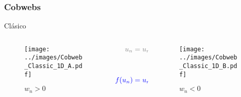 \documentclass{beamer}
\begin{document}
\begin{frame}
    \frametitle[prueb1]{Cobwebs}{Clásico}
    \centering
    \begin{columns}
        \begin{column}{0.4\textwidth}
            \vspace{0.5cm}
            \begin{figure}
                \centering
                \texttt{[image: ../images/Cobweb\_Classic\_1D\_A.pdf]}
                \caption{$w_n>0$}
            \end{figure}  
        \end{column}
        \begin{column}{0.2\textwidth}
            \centering
            \begin{align*}
                \color{gray} u_n &\color{gray} =  u_{n-1} \\[1cm]
                \color{blue} f(u_n) &\color{blue} =  u_{n-1} - 2w_n
            \end{align*}
        \end{column}
        \begin{column}{0.4\textwidth}
            \begin{figure}
                \centering
                \texttt{[image: ../images/Cobweb\_Classic\_1D\_B.pdf]}
                \caption{$w_n<0$}
            \end{figure}  
        \end{column}
    \end{columns}
\end{frame}
\end{document}
